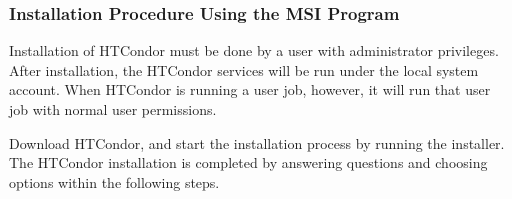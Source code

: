 \subsubsection{\label{sec:nt-install-procedure}
Installation Procedure Using the MSI Program}

% 

Installation of HTCondor must be done by a user with administrator privileges.
After installation, the HTCondor services will be run under 
the local system account.
When HTCondor is running a user job, however, 
it will run that user job with normal user permissions.

Download HTCondor, and start the installation process by running the installer. 
The HTCondor installation is completed by answering questions 
and choosing options within the following steps.

